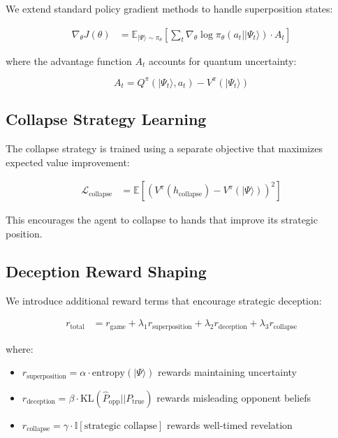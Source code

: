 \documentclass[11pt,a4paper]{article}
\begin{document}
We extend standard policy gradient methods to handle superposition states:

\begin{align}
\nabla_\theta J(\theta) &= \mathbb{E}_{|\Psi\rangle \sim \pi_\theta}\left[\sum_t \nabla_\theta \log \pi_\theta(a_t||\Psi_t\rangle) \cdot A_t\right]
\end{align}

where the advantage function $A_t$ accounts for quantum uncertainty:

\begin{equation}
A_t = Q^{\pi}(|\Psi_t\rangle, a_t) - V^{\pi}(|\Psi_t\rangle)
\end{equation}

\subsection{Collapse Strategy Learning}

The collapse strategy is trained using a separate objective that maximizes expected value improvement:

\begin{align}
\mathcal{L}_{\text{collapse}} &= \mathbb{E}\left[\left(V^{\pi}(h_{\text{collapse}}) - V^{\pi}(|\Psi\rangle)\right)^2\right]
\end{align}

This encourages the agent to collapse to hands that improve its strategic position.

\subsection{Deception Reward Shaping}

We introduce additional reward terms that encourage strategic deception:

\begin{align}
r_{\text{total}} &= r_{\text{game}} + \lambda_1 r_{\text{superposition}} + \lambda_2 r_{\text{deception}} + \lambda_3 r_{\text{collapse}}
\end{align}

where:
\begin{itemize}
\item $r_{\text{superposition}} = \alpha \cdot \text{entropy}(|\Psi\rangle)$ rewards maintaining uncertainty
\item $r_{\text{deception}} = \beta \cdot \text{KL}(\hat{P}_{\text{opp}}||P_{\text{true}})$ rewards misleading opponent beliefs
\item $r_{\text{collapse}} = \gamma \cdot \mathbb{I}[\text{strategic collapse}]$ rewards well-timed revelation
\end{itemize}
\end{document}
